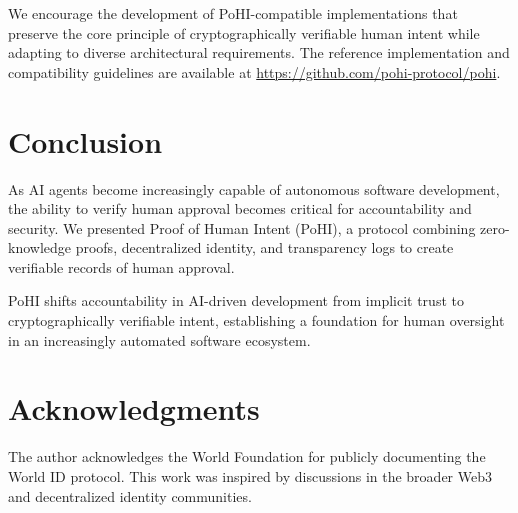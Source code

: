 \documentclass[conference]{IEEEtran}
\begin{document}
We encourage the development of PoHI-compatible implementations that preserve the core principle of cryptographically verifiable human intent while adapting to diverse architectural requirements. The reference implementation and compatibility guidelines are available at \url{https://github.com/pohi-protocol/pohi}.

\section{Conclusion}

As AI agents become increasingly capable of autonomous software development, the ability to verify human approval becomes critical for accountability and security. We presented Proof of Human Intent (PoHI), a protocol combining zero-knowledge proofs, decentralized identity, and transparency logs to create verifiable records of human approval.

PoHI shifts accountability in AI-driven development from implicit trust to cryptographically verifiable intent, establishing a foundation for human oversight in an increasingly automated software ecosystem.

\section*{Acknowledgments}

The author acknowledges the World Foundation for publicly documenting the World ID protocol. This work was inspired by discussions in the broader Web3 and decentralized identity communities.


\end{document}
